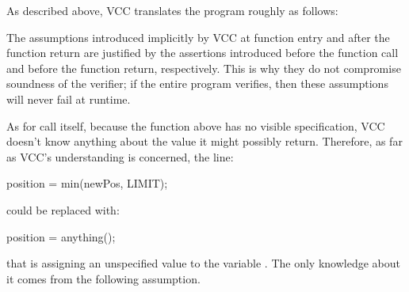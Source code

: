As described above, VCC translates the program roughly as follows:

\begin{note}
The assumptions introduced implicitly by VCC at function entry and
after the function return are justified by the assertions
introduced before the function call and before the function return, respectively.
This is why they do not compromise soundness of the verifier;
\ie if the entire program verifies, then 
these assumptions will never fail at runtime.
\end{note}

As for call itself, because the  function above has no
visible specification, VCC doesn't know anything about the value it
might possibly return.  Therefore, as far as VCC's understanding is
concerned, the line:
\begin{VCC}
position = min(newPos, LIMIT);
\end{VCC}
\noindent
could be replaced with:
\begin{VCC}
position = anything();
\end{VCC}
\noindent
that is assigning an unspecified value to the variable .
The only knowledge about it comes from the following assumption.

